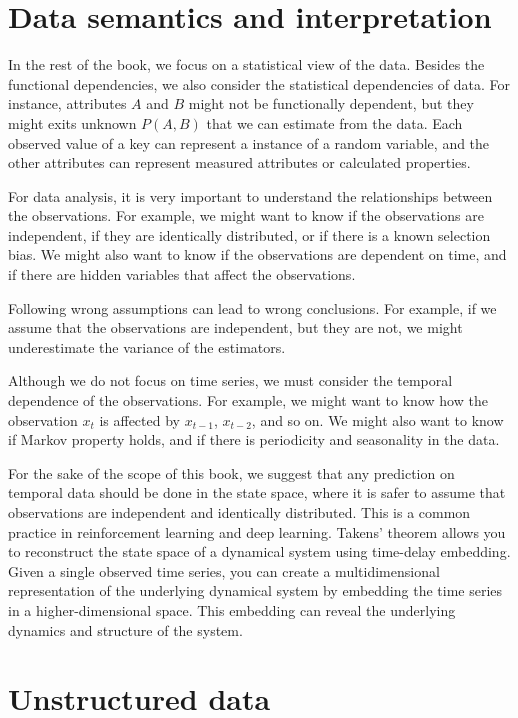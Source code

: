 \section{Data semantics and interpretation}

In the rest of the book, we focus on a statistical view of the data.  Besides the
functional dependencies, we also consider the statistical dependencies of data.  For
instance, attributes $A$ and $B$ might not be functionally dependent, but they might exits
unknown $P(A, B)$ that we can estimate from the data.  Each observed value of a key can
represent a instance of a random variable, and the other attributes can represent
measured attributes or calculated properties.

For data analysis, it is very important to understand the relationships between the
observations.  For example, we might want to know if the observations are independent, if
they are identically distributed, or if there is a known selection bias.  We might also
want to know if the observations are dependent on time, and if there are hidden variables
that affect the observations.

Following wrong assumptions can lead to wrong conclusions.  For example, if we assume that
the observations are independent, but they are not, we might underestimate the variance of
the estimators.

Although we do not focus on time series, we must consider the temporal dependence of the
observations.  For example, we might want to know how the observation $x_t$ is affected by
$x_{t-1}$, $x_{t-2}$, and so on.  We might also want to know if Markov property holds,
and if there is periodicity and seasonality in the data.

For the sake of the scope of this book, we suggest that any prediction on temporal data
should be done in the state space, where it is safer to assume that observations are
independent and identically distributed.  This is a common practice in reinforcement
learning and deep learning. Takens' theorem allows you to
reconstruct the state space of a dynamical system using time-delay embedding. Given a
single observed time series, you can create a multidimensional representation of the
underlying dynamical system by embedding the time series in a higher-dimensional space.
This embedding can reveal the underlying dynamics and structure of the system.

\section{Unstructured data}

